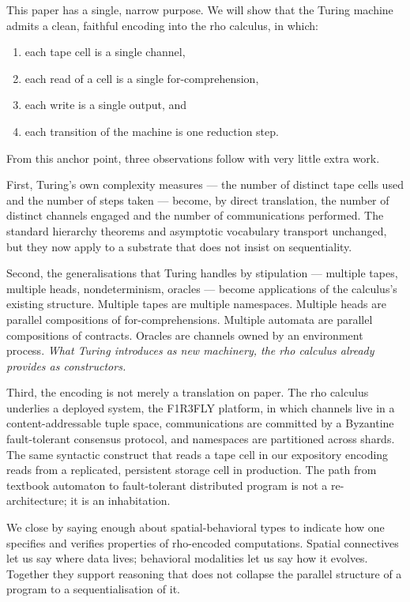 \documentclass[11pt]{article}
\theoremstyle{plain}
\theoremstyle{definition}
\theoremstyle{remark}
\begin{document}
This paper has a single, narrow purpose. We will show that the Turing
machine admits a clean, faithful encoding into the rho calculus, in which:

\begin{enumerate}[label=(\roman*)]
\item each tape cell is a single channel,
\item each read of a cell is a single for-comprehension,
\item each write is a single output, and
\item each transition of the machine is one reduction step.
\end{enumerate}

\noindent From this anchor point, three observations follow with very little
extra work.

First, Turing's own complexity measures --- the number of distinct tape
cells used and the number of steps taken --- become, by direct translation,
the number of distinct channels engaged and the number of communications
performed. The standard hierarchy theorems and asymptotic vocabulary
transport unchanged, but they now apply to a substrate that does not insist
on sequentiality.

Second, the generalisations that Turing handles by stipulation --- multiple
tapes, multiple heads, nondeterminism, oracles --- become applications of
the calculus's existing structure. Multiple tapes are multiple namespaces.
Multiple heads are parallel compositions of for-comprehensions. Multiple
automata are parallel compositions of contracts. Oracles are channels owned
by an environment process. \emph{What Turing introduces as new machinery, the
rho calculus already provides as constructors.}

Third, the encoding is not merely a translation on paper. The rho calculus
underlies a deployed system, the F1R3FLY platform, in which channels live in
a content-addressable tuple space, communications are committed by a
Byzantine fault-tolerant consensus protocol, and namespaces are partitioned
across shards. The same syntactic construct that reads a tape cell in our
expository encoding reads from a replicated, persistent storage cell in
production. The path from textbook automaton to fault-tolerant distributed
program is not a re-architecture; it is an inhabitation.

We close by saying enough about spatial-behavioral types to indicate how
one specifies and verifies properties of rho-encoded computations. Spatial
connectives let us say where data lives; behavioral modalities let us say
how it evolves. Together they support reasoning that does not collapse the
parallel structure of a program to a sequentialisation of it.
\end{document}
